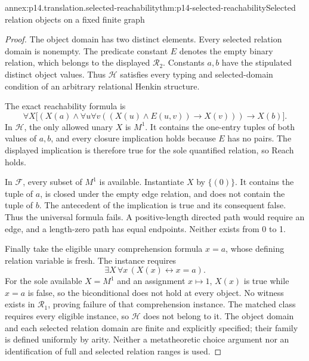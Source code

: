\begin{annexitem}{annex:p14.translation.selected-reachability}{thm:p14-selected-reachability}{Selected relation objects on a fixed finite graph}
\begin{proof}
The object domain has two distinct elements. Every selected relation
domain is nonempty. The predicate constant \(E\) denotes the empty
binary relation, which belongs to the displayed \(\mathcal R_2\).
Constants \(a,b\) have the stipulated distinct object values. Thus
\(\mathcal H\) satisfies every typing and selected-domain condition
of an arbitrary relational Henkin structure.

The exact reachability formula is
\[
 \forall X\bigl[(X(a)\land
     \forall u\forall v((X(u)\land E(u,v))\to X(v)))\to X(b)\bigr].
\]
In \(\mathcal H\), the only allowed unary \(X\) is \(M^1\).
It contains the one-entry tuples of both values of \(a,b\), and every closure implication
holds because \(E\) has no pairs. The displayed implication is
therefore true for the sole quantified relation, so Reach holds.

In \(\mathcal F\), every subset of \(M^1\) is available. Instantiate
\(X\) by \(\{(0)\}\). It contains the tuple of \(a\), is closed under the empty
edge relation, and does not contain the tuple of \(b\). The antecedent of the
implication is true and its consequent false. Thus the universal formula
fails. A positive-length directed path would require an edge, and a
length-zero path has equal endpoints. Neither exists from 0 to 1.

Finally take the eligible unary comprehension formula \(x=a\), whose
defining relation variable is fresh. The instance requires
\[
 \exists X\,\forall x\,(X(x)\leftrightarrow x=a).
\]
For the sole available \(X=M^1\) and an assignment \(x\mapsto1\),
\(X(x)\) is true while \(x=a\) is false, so the biconditional does not
hold at every object. No witness exists
in \(\mathcal R_1\), proving failure of that comprehension instance.
The matched class requires every eligible instance, so \(\mathcal H\)
does not belong to it. The object domain and each selected relation domain
are finite and explicitly specified; their family is defined uniformly
by arity. Neither a metatheoretic choice argument nor an identification
of full and selected relation ranges is used.
\end{proof}
\end{annexitem}
